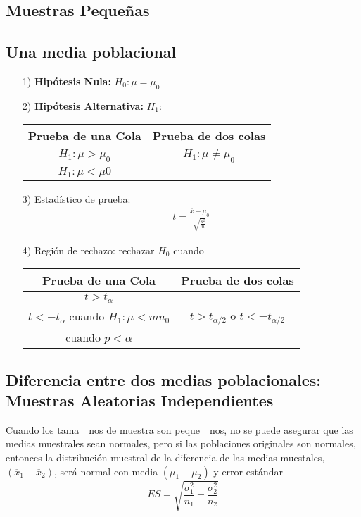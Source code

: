 \begin{itemize}
\section{Muestras Peque\~nas}
\subsection*{Una media poblacional}

\begin{itemize}
\item[1) ] \textbf{Hip\'otesis Nula:} $H_{0}:\mu=\mu_{0}$
\item[2) ] \textbf{Hip\'otesis Alternativa: } $H_{1}:$
\begin{tabular}{cc}\hline
\textbf{Prueba de una Cola} & \textbf{Prueba de dos colas}\\\hline
$H_{1}:\mu>\mu_{0}$ & $H_{1}:\mu\neq \mu_{0}$\\ 
$H_{1}:\mu<\mu0$&\\
\end{tabular}
\item[3) ] Estad\'istico de prueba:
\begin{eqnarray*}
t=\frac{\overline{x}-\mu_{0}}{\sqrt{\frac{s^{2}}{n}}}
\end{eqnarray*}
\item[4) ] Regi\'on de rechazo: rechazar $H_{0}$ cuando
\begin{tabular}{cc}\hline
\textbf{Prueba de una Cola} & \textbf{Prueba de dos colas}\\\hline
$t>t_{\alpha}$ & \\
$t<-t_{\alpha}$ cuando $H_{1}:\mu<mu_{0}$&$t>t_{\alpha/2}$ o $t<-t_{\alpha/2}$\\
 cuando $p<\alpha$&\\
\end{tabular}
\end{itemize}
\subsection*{Diferencia entre dos medias poblacionales: Muestras Aleatorias Independientes}
Cuando los tama\ ~nos de muestra son peque\ ~nos, no se puede asegurar que las medias muestrales sean normales, pero si las poblaciones originales son normales, entonces la distribuci\'on muestral de la diferencia de las medias muestales, $\left(\overline{x}_{1}-\overline{x}_{2}\right)$, ser\'a normal con media $\left(\mu_{1}-\mu_{2}\right)$ y error est\'andar $$ES=\sqrt{\frac{\sigma_{1}^{2}}{n_{1}}+\frac{\sigma_{2}^{2}}{n_{2}}}$$



\end{itemize}
